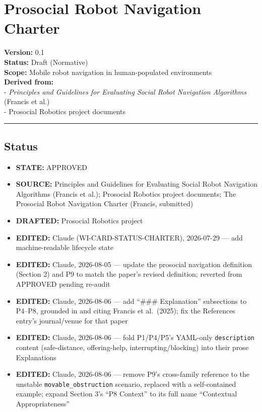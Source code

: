 \documentclass[utf8]{frontiers_suppmat} %
\providecommand{\tightlist}{%
  \setlength{\itemsep}{0pt}\setlength{\parskip}{0pt}}
\begin{document}
\section{Prosocial Robot Navigation
Charter}\label{prosocial-robot-navigation-charter}

\textbf{Version:} 0.1\\
\textbf{Status:} Draft (Normative)\\
\textbf{Scope:} Mobile robot navigation in human-populated
environments\\
\textbf{Derived from:}\\
- \emph{Principles and Guidelines for Evaluating Social Robot Navigation
Algorithms} (Francis et al.)\\
- Prosocial Robotics project documents

\begin{center}\rule{0.5\linewidth}{0.5pt}\end{center}

\subsection{Status}\label{status}

\begin{itemize}
\tightlist
\item
  \textbf{STATE:} APPROVED
\item
  \textbf{SOURCE:} Principles and Guidelines for Evaluating Social Robot
  Navigation Algorithms (Francis et al.); Prosocial Robotics project
  documents; The Prosocial Robot Navigation Charter (Francis, submitted)
\item
  \textbf{DRAFTED:} Prosocial Robotics project
\item
  \textbf{EDITED:} Claude (WI-CARD-STATUS-CHARTER), 2026-07-29 --- add
  machine-readable lifecycle state
\item
  \textbf{EDITED:} Claude, 2026-08-05 --- update the prosocial
  navigation definition (Section 2) and P9 to match the paper's revised
  definition; reverted from APPROVED pending re-audit
\item
  \textbf{EDITED:} Claude, 2026-08-06 --- add ``\#\#\# Explanation''
  subsections to P4--P8, grounded in and citing Francis et al.~(2025);
  fix the References entry's journal/venue for that paper
\item
  \textbf{EDITED:} Claude, 2026-08-06 --- fold P1/P4/P5's YAML-only
  \texttt{description} content (safe-distance, offering-help,
  interrupting/blocking) into their prose Explanations
\item
  \textbf{EDITED:} Claude, 2026-08-06 --- remove P9's cross-family
  reference to the unstable \texttt{movable\_obstruction} scenario,
  replaced with a self-contained example; expand Section 3's ``P8
  Context'' to its full name ``Contextual Appropriateness''
\end{itemize}
\end{document}
